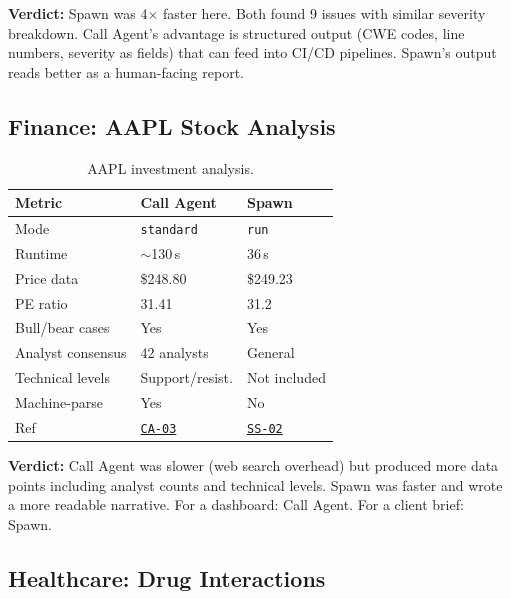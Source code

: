 \documentclass[11pt,twocolumn]{article}
\newcommand{\win}[1]{\cellcolor{winner}#1}
\newcommand{\lose}[1]{\cellcolor{loser}#1}
\newcommand{\tie}[1]{\cellcolor{tied}#1}
\newcommand{\ghbase}{https://github.com/agenticmail/agenticmail/blob/main/research/agent-rpc-vs-spawn}
\begin{document}
\textbf{Verdict:} Spawn was 4$\times$ faster here. Both found 9 issues with similar severity breakdown. Call Agent's advantage is structured output (CWE codes, line numbers, severity as fields) that can feed into CI/CD pipelines. Spawn's output reads better as a human-facing report.

\subsection{Finance: AAPL Stock Analysis}

\begin{table}[H]
\centering
\caption{AAPL investment analysis.}
\begin{tabular}{@{}p{2.2cm}p{2.1cm}p{2.1cm}@{}}
\toprule
\textbf{Metric} & \textbf{Call Agent} & \textbf{Spawn} \\
\midrule
Mode & \texttt{standard} & \texttt{run} \\
Runtime & \lose{$\sim$130\,s} & \win{36\,s} \\
Price data & \$248.80 & \$249.23 \\
PE ratio & 31.41 & 31.2 \\
Bull/bear cases & \tie{Yes} & \tie{Yes} \\
Analyst consensus & \win{42 analysts} & General \\
Technical levels & \win{Support/resist.} & Not included \\
Machine-parse & \win{Yes} & \lose{No} \\
Ref & \href{\ghbase/results-callagent/03-finance-aapl-standard.md}{\texttt{CA-03}} & \href{\ghbase/results/02-finance-aapl.md}{\texttt{SS-02}} \\
\bottomrule
\end{tabular}
\end{table}

\textbf{Verdict:} Call Agent was slower (web search overhead) but produced more data points including analyst counts and technical levels. Spawn was faster and wrote a more readable narrative. For a dashboard: Call Agent. For a client brief: Spawn.

\subsection{Healthcare: Drug Interactions}
\end{document}
